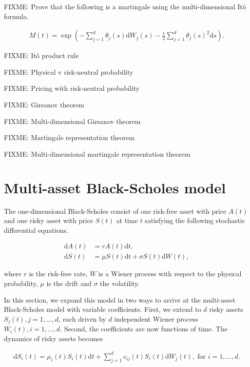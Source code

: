 \documentclass[a4paper]{article}
\begin{document}
FIXME: Prove that the following is a martingale using the multi-dimensional It\^o formula.

\begin{align}\label{eq:exp-sums-martingale}
  M(t) = \exp \left( - \sum_{j=1}^{d} \theta_j(s) \mathrm{d}W_j(s) - \frac{1}{2} \sum_{j=1}^{d} \theta_j(s)^2 \mathrm{d}s \right).
\end{align}

FIXME: It\^o product rule

FIXME: Physical v risk-neutral probability

FIXME: Pricing with risk-neutral probability

FIXME: Girsanov theorem

FIXME: Multi-dimensional Girsanov theorem

FIXME: Martingale representation theorem

FIXME: Multi-dimensional martingale representation theorem

\pagebreak
\section{Multi-asset Black-Scholes model}


The one-dimensional Black-Scholes consist of one risk-free asset with price $A(t)$ and one risky asset with price $S(t)$ at time $t$ satisfying the following stochastic differential equations.

\begin{align*}
  \mathrm{d}A(t) &= r A(t) \mathrm{d}t,\\
  \mathrm{d}S(t) &= \mu S(t) \mathrm{d}t + \sigma S(t) \mathrm{d}W(t),
\end{align*}

where $r$ is the risk-free rate, $W$ is a Wiener process with respect to the physical probability, $\mu$ is the drift and $\sigma$ the volatility.

In this section, we expand this model in two ways to arrive at the multi-asset Black-Scholes model with variable coefficients. First, we extend to $d$ risky assets $S_j(t), j =  1, \ldots, d$, each driven by $d$ independent Wiener process $W_i(t), i = 1, \ldots, d$. Second, the coefficients are now functions of time. The dynamics of risky assets becomes

\begin{align}\label{eq:multi-bs-eq}
  \mathrm{d}S_i(t) = \mu_i(t) S_i(t) \mathrm{d}t + \sum_{j=1}^{d} c_{ij}(t) S_i(t) \mathrm{d}W_j(t), \text{ for } i = 1,\ldots,d.
\end{align}
\end{document}
